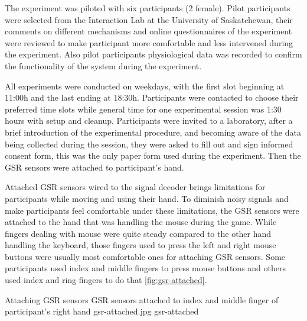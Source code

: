 The experiment was piloted with six participants (2 female). Pilot participants were selected from the Interaction Lab at the University of Saskatchewan, their comments on different mechanisms and online questionnaires of the experiment were reviewed to make participant more comfortable and less intervened during the experiment. Also pilot participants physiological data was recorded to confirm the functionality of the system during the experiment.

All experiments were conducted on weekdays, with the first slot beginning at 11:00h and the last ending at 18:30h. Participants were contacted to choose their preferred time slots while general time for one experimental session was 1:30 hours with setup and cleanup. Participants were invited to a laboratory, after a brief introduction of the experimental procedure, and becoming aware of the data being collected during the session, they were asked to fill out and sign informed consent form, this was the only paper form used during the experiment. Then the GSR sensors were attached to participant's hand.

Attached GSR sensors wired to the signal decoder brings limitations for participants while moving and using their hand. To diminish noisy signals and make participants feel comfortable under these limitations, the GSR sensors were attached to the hand that was handling the mouse during the game. While fingers dealing with mouse were quite steady compared to the other hand handling the keyboard, those fingers used to press the left and right mouse buttons were usually most comfortable ones for attaching GSR sensors. Some participants used index and middle fingers to press mouse buttons and others used index and ring fingers to do that \ref{fig:gsr-attached}.

\img
{Attaching GSR sensors}
{GSR sensors attached to index and middle finger of participant's right hand}
{gsr-attached.jpg}
{gsr-attached}


